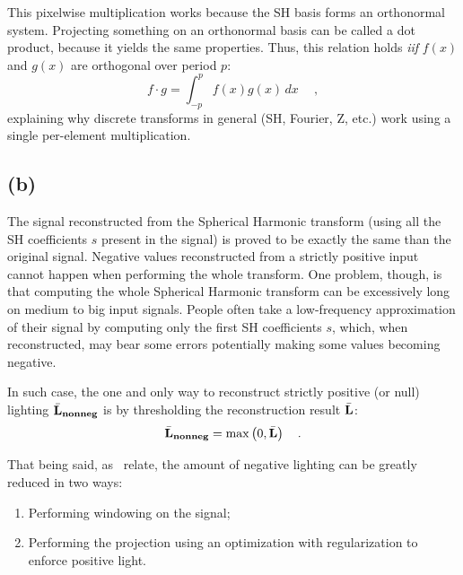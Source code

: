 \documentclass{report}
\begin{document}

This pixelwise multiplication works because the SH basis forms an orthonormal system. Projecting something on an orthonormal basis can be called a dot product, because it yields the same properties. Thus, this relation holds \emph{iif} $f(x)$ and $g(x)$ are orthogonal over period $p$:
\begin{equation}
f \cdot g=\int_{-p}^p f(x)g(x)\,dx\ \quad,
\end{equation}
explaining why discrete transforms in general (SH, Fourier, Z, etc.) work using a single per-element multiplication.


\subsection{(b)}

The signal reconstructed from the Spherical Harmonic transform (using all the SH coefficients $s$ present in the signal) is proved to be exactly the same than the original signal. Negative values reconstructed from a strictly positive input cannot happen when performing the whole transform. One problem, though, is that computing the whole Spherical Harmonic transform can be excessively long on medium to big input signals. People often take a low-frequency approximation of their signal by computing only the first SH coefficients $s$, which, when reconstructed, may bear some errors potentially making some values becoming negative.

In such case, the one and only way to reconstruct strictly positive (or null) lighting $\bar{\mathbf{L}}_{\mathbf{nonneg}}$ is by thresholding the reconstruction result $\bar{\mathbf{L}}$:
\begin{equation}
\bar{\mathbf{L}}_{\mathbf{nonneg}} = \max\left( 0, \bar{\mathbf{L}} \right) \quad.
\end{equation}

That being said, as~\cite{Sloan2008}  relate, the amount of negative lighting can be greatly reduced in two ways:
\begin{enumerate}
  \item{Performing windowing on the signal;}
  \item{Performing the projection using an optimization with regularization to enforce positive light.}
\end{enumerate}
\end{document}
